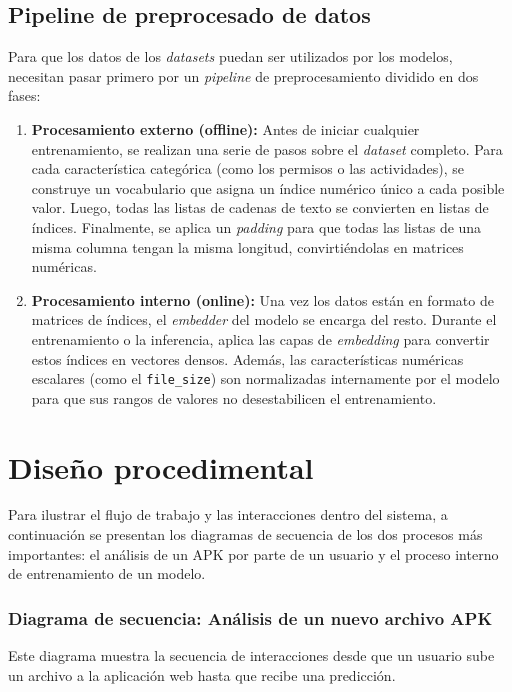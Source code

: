 \subsection{Pipeline de preprocesado de datos}
Para que los datos de los \textit{datasets} puedan ser utilizados por los modelos, necesitan pasar primero por un \textit{pipeline} de preprocesamiento dividido en dos fases:

\begin{enumerate}
	\item \textbf{Procesamiento externo (offline):} Antes de iniciar cualquier entrenamiento, se realizan una serie de pasos sobre el \textit{dataset} completo. Para cada característica categórica (como los permisos o las actividades), se construye un vocabulario que asigna un índice numérico único a cada posible valor. Luego, todas las listas de cadenas de texto se convierten en listas de índices. Finalmente, se aplica un \textit{padding} para que todas las listas de una misma columna tengan la misma longitud, convirtiéndolas en matrices numéricas.	
	
	\item \textbf{Procesamiento interno (online):} Una vez los datos están en formato de matrices de índices, el \textit{embedder} del modelo se encarga del resto. Durante el entrenamiento o la inferencia, aplica las capas de \textit{embedding} para convertir estos índices en vectores densos. Además, las características numéricas escalares (como el \texttt{file\_size}) son normalizadas internamente por el modelo para que sus rangos de valores no desestabilicen el entrenamiento.
\end{enumerate}

\section{Diseño procedimental}
Para ilustrar el flujo de trabajo y las interacciones dentro del sistema, a continuación se presentan los diagramas de secuencia de los dos procesos más importantes: el análisis de un APK por parte de un usuario y el proceso interno de entrenamiento de un modelo.

\subsubsection{Diagrama de secuencia: Análisis de un nuevo archivo APK}
Este diagrama muestra la secuencia de interacciones desde que un usuario sube un archivo a la aplicación web hasta que recibe una predicción.

